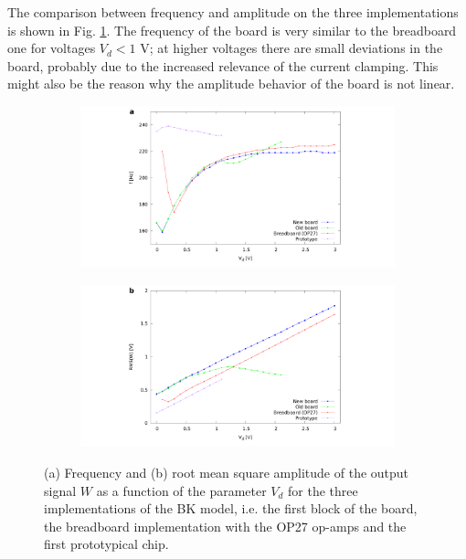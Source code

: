 \documentclass[a4paper,11pt,aps,secnumarabic,balancelastpage,amsmath,amssymb,floatfix,table]{article}
\begin{document}
The comparison between frequency and amplitude on the three
implementations is shown in Fig. \ref{fig:comparison}.
The frequency of the board is very similar to the breadboard one
for voltages $V_d < 1$ V; at higher voltages there are small
deviations in the board, probably due to the increased relevance
of the current clamping. This might also be the reason why the
amplitude behavior of the board is not linear.

\begin{figure}[H]
    \centering
    \begin{subfigure}{.49\textwidth}
        \includegraphics[width=\linewidth,trim={10cm 0 9cm 0},clip,left]
        {../1_block/images/freq_comparison.pdf}
    \end{subfigure}
    \begin{subfigure}{.49\textwidth}
        \centering
        \includegraphics[width=\linewidth,trim={9cm 0 10cm 0},clip,right]
        {../1_block/images/rms_comparison.pdf}
    \end{subfigure}
    \caption{(a) Frequency and (b) root mean square amplitude
    of the output signal $W$ as a function of the parameter $V_d$
    for the three implementations of the BK model, i.e. the first
    block of the board, the breadboard implementation with the
    OP27 op-amps and the first prototypical chip.}
    \label{fig:comparison}
\end{figure}
\end{document}
